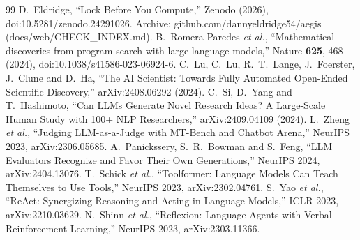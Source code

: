 \documentclass[aps,prd,twocolumn,superscriptaddress,nofootinbib,showkeys]{revtex4-2}
\begin{document}
\begin{thebibliography}{99}
 D.~Eldridge, ``Lock Before You Compute,'' Zenodo (2026), doi:10.5281/zenodo.24291026.
 Archive: github.com/dannyeldridge54/aegis (docs/web/CHECK\_INDEX.md).
 B.~Romera-Paredes \emph{et al.}, ``Mathematical discoveries from program search with large language models,'' Nature \textbf{625}, 468 (2024), doi:10.1038/s41586-023-06924-6.
 C.~Lu, C.~Lu, R.~T.~Lange, J.~Foerster, J.~Clune and D.~Ha, ``The AI Scientist: Towards Fully Automated Open-Ended Scientific Discovery,'' arXiv:2408.06292 (2024).
 C.~Si, D.~Yang and T.~Hashimoto, ``Can LLMs Generate Novel Research Ideas? A Large-Scale Human Study with 100+ NLP Researchers,'' arXiv:2409.04109 (2024).
 L.~Zheng \emph{et al.}, ``Judging LLM-as-a-Judge with MT-Bench and Chatbot Arena,'' NeurIPS 2023, arXiv:2306.05685.
 A.~Panickssery, S.~R.~Bowman and S.~Feng, ``LLM Evaluators Recognize and Favor Their Own Generations,'' NeurIPS 2024, arXiv:2404.13076.
 T.~Schick \emph{et al.}, ``Toolformer: Language Models Can Teach Themselves to Use Tools,'' NeurIPS 2023, arXiv:2302.04761.
 S.~Yao \emph{et al.}, ``ReAct: Synergizing Reasoning and Acting in Language Models,'' ICLR 2023, arXiv:2210.03629.
 N.~Shinn \emph{et al.}, ``Reflexion: Language Agents with Verbal Reinforcement Learning,'' NeurIPS 2023, arXiv:2303.11366.
\end{thebibliography}
\end{document}
